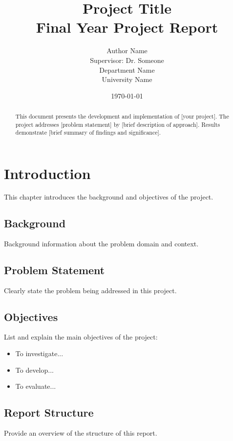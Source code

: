 \documentclass[12pt,a4paper]{report}
\title{
    \LARGE\textbf{Project Title}\\
    \vspace{0.5cm}
    \large Final Year Project Report
}
\author{
    Author Name\\
    \vspace{0.3cm}
    Supervisor: Dr. Someone\\
    Department Name\\
    University Name
}
\date{\today}
\begin{document}
\maketitle
\thispagestyle{empty}

\begin{abstract}
    This document presents the development and implementation of [your project]. 
    The project addresses [problem statement] by [brief description of approach].
    Results demonstrate [brief summary of findings and significance].
\end{abstract}

\tableofcontents
\clearpage

\chapter{Introduction}

This chapter introduces the background and objectives of the project.

\section{Background}
Background information about the problem domain and context.

\section{Problem Statement}
Clearly state the problem being addressed in this project.

\section{Objectives}
List and explain the main objectives of the project:

\begin{itemize}
    \item To investigate...
    \item To develop...
    \item To evaluate...
\end{itemize}

\section{Report Structure}
Provide an overview of the structure of this report.
\end{document}
